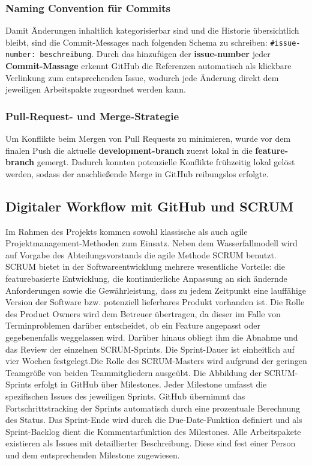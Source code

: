 \subsubsection{Naming Convention für Commits}
Damit Änderungen inhaltlich kategorisierbar sind und die Historie übersichtlich bleibt, sind die Commit-Messages nach folgenden Schema zu schreiben: \texttt{\#issue-number: \textlangle beschreibung\textrangle}.\newline
Durch das hinzufügen der \textbf{issue-number} jeder \textbf{Commit-Massage} erkennt GitHub die Referenzen automatisch als klickbare Verlinkung\cite{github_autolinked_references} zum entsprechenden Issue, wodurch jede Änderung direkt dem jeweiligen Arbeitspakte zugeordnet werden kann.
\subsubsection{Pull-Request- und Merge-Strategie}
Um Konflikte beim Mergen von Pull Requests zu minimieren, wurde vor dem finalen Push die aktuelle \textbf{development-branch} zuerst lokal in die \textbf{feature-branch} gemergt\cite{git_branching_merging_chacon2014progit}. Dadurch konnten potenzielle Konflikte frühzeitig lokal gelöst werden, sodass der anschließende Merge in GitHub reibungslos erfolgte.
\subsection{Digitaler Workflow mit GitHub und SCRUM}
Im Rahmen des Projekts kommen sowohl klassische als auch agile Projektmanagement-Methoden zum Einsatz. Neben dem Wasserfallmodell wird auf Vorgabe des Abteilungsvorstands die agile Methode SCRUM benutzt.\newline
SCRUM bietet in der Softwareentwicklung mehrere wesentliche Vorteile\cite{scrum_entscheidungen}: die featurebasierte Entwicklung, die kontinuierliche Anpassung an sich ändernde Anforderungen sowie die Gewährleistung, dass zu jedem Zeitpunkt eine lauffähige Version der Software bzw. potenziell lieferbares Produkt vorhanden ist.\newline
Die Rolle des Product Owners wird dem Betreuer übertragen, da dieser im Falle von Terminproblemen darüber entscheidet, ob ein Feature angepasst oder gegebenenfalls weggelassen wird. Darüber hinaus obliegt ihm die Abnahme und das Review der einzelnen SCRUM-Sprints. Die Sprint-Dauer ist einheitlich auf vier Wochen festgelegt.Die Rolle des SCRUM-Masters wird aufgrund der geringen Teamgröße von beiden Teammitgliedern ausgeübt.\newline
Die Abbildung der SCRUM-Sprints erfolgt in GitHub über Milestones. Jeder Milestone\cite{codetree2017sprintplanning} umfasst die spezifischen Issues des jeweiligen Sprints. GitHub übernimmt das Fortschrittstracking der Sprints automatisch\cite{github2026milestones} durch eine prozentuale Berechnung des Status. Das Sprint-Ende wird durch die Due-Date-Funktion definiert und als Sprint-Backlog dient die Kommentarfunktion des Milestones. Alle Arbeitspakete existieren als Issues mit detaillierter Beschreibung. Diese sind fest einer Person und dem entsprechenden Milestone zugewiesen\cite{github2026associatingmilestones}.
